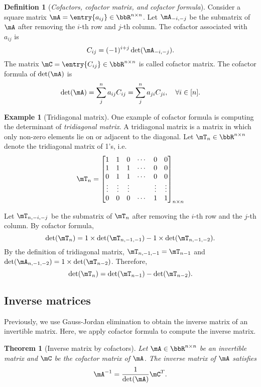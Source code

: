 \documentclass[11pt]{article}
\theoremstyle{plain}
\newtheorem{thm}{Theorem}[section]
\theoremstyle{definition}
\newtheorem{defn}{Definition}
\newtheorem{example}{Example}
\begin{document}
\begin{defn}[\textit{Cofactors, cofactor matrix, and cofactor formula}]
	Consider a square matrix $\mA=  \entry{a_{ij}} \in \bbR^{n \times n}$. Let $\mA_{-i,-j}$ be the submatrix of $\mA$ after removing the $i$-th row and $j$-th column. The cofactor associated with $a_{ij}$ is \[C_{ij} = (-1)^{i+j}\det(\mA_{-i,-j}).\]
	The matrix $\mC = \entry{C_{ij}} \in \bbR^{n \times n}$ is called cofactor matrix.  The cofactor formula of $\det(\mA)$ is 
	\[ \det(\mA) = \sum_{j}^n a_{ij} C_{ij} = \sum_{j}^n a_{ji} C_{ji} ,\quad \forall i \in [n].  \]
\end{defn}

\begin{example}[Tridiagonal matrix]
	One example of cofactor formula is computing the determinant of \textit{tridiagonal matrix}. A tridiagonal matrix is a matrix in which only non-zero elements lie on or adjacent to the diagonal. Let $\mT_n \in \bbR^{n \times n}$ denote the tridiagonal matrix of 1's, i.e.\
\begin{align}
	\mT_n = \begin{bmatrix}
		1 &1&0 &\cdots & 0 &0\\
		1&1&1&\cdots &0&0\\
		0&1&1&\cdots &0&0\\
		\vdots &\vdots &\vdots &&\vdots &\vdots \\
		0&0&0&\cdots&1&1
	\end{bmatrix}_{n \times n}
\end{align} 

Let $\mT_{n, -i,-j}$ be the submatrix of  $\mT_n$ after removing the $i$-th row and the $j$-th column.   By cofactor formula, 
\[  \det(\mT_n) = 1 \times \det(\mT_{n, -1,-1}) - 1 \times \det(\mT_{n,-1,-2}). \]
By the definition of tridiagonal matrix, $\mT_{n,-1,-1} = \mT_{n-1}$ and $\det( \mA_{n,-1,-2}) = 1 \times \det(\mT_{n-2}) $. Therefore, 
\[ \det(\mT_n) = \det(\mT_{n-1}) - \det(\mT_{n-2}).  \] 
\end{example}

\subsection{Inverse matrices}
Previously, we use Gauss-Jordan elimination to obtain the inverse matrix of an invertible matrix. Here, we apply cofactor formula to compute the inverse matrix.

\begin{thm}[Inverse matrix by cofactors]\label{thm:inver}
Let $\mA \in \bbR^{n \times n}$ be an invertible matrix and $\mC$ be the cofactor matrix of $\mA$. The inverse matrix of $\mA$ satisfies
\[  \mA^{-1} = \frac{1}{\det(\mA)} \mC^T. \]	
\end{thm}
\end{document}
